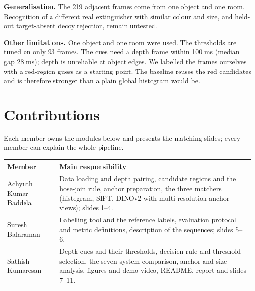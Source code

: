 \documentclass[11pt,a4paper]{article}
\begin{document}
\textbf{Generalisation.} The 219 adjacent frames come from one object and one room. Recognition of a different real extinguisher with similar colour and size, and held-out target-absent decoy rejection, remain untested.

\textbf{Other limitations.} One object and one room were used. The thresholds are tuned on only 93 frames. The cues need a depth frame within 100 ms (median gap 28 ms); depth is unreliable at object edges. We labelled the frames ourselves with a red-region guess as a starting point. The baseline reuses the red candidates and is therefore stronger than a plain global histogram would be.

\FloatBarrier
\section{Contributions}
Each member owns the modules below and presents the matching slides; every member can explain the whole pipeline.

\begin{center}\small
\begin{tabular}{lp{9cm}}
\toprule
Member & Main responsibility \\
\midrule
Achyuth Kumar Baddela & Data loading and depth pairing, candidate regions and the hose-join rule, anchor preparation, the three matchers (histogram, SIFT, DINOv2 with multi-resolution anchor views); slides 1--4. \\
Suresh Balaraman & Labelling tool and the reference labels, evaluation protocol and metric definitions, description of the sequences; slides 5--6. \\
Sathish Kumaresan & Depth cues and their thresholds, decision rule and threshold selection, the seven-system comparison, anchor and size analysis, figures and demo video, README, report and slides 7--11. \\
\bottomrule
\end{tabular}
\end{center}

\end{document}
